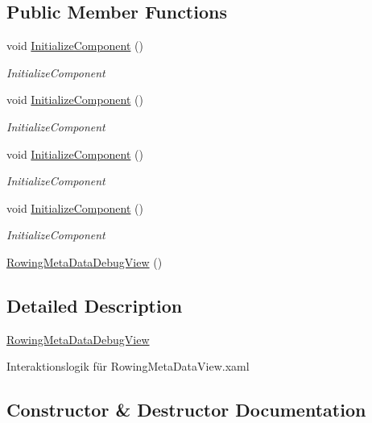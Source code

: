 \subsection*{Public Member Functions}
\begin{DoxyCompactItemize}
\item 
void \hyperlink{class_rowing_monitor_1_1_view_1_1_rowing_meta_data_debug_view_abc8c4176d174df5466c0503576ecc5c9}{Initialize\+Component} ()
\begin{DoxyCompactList}\small\item\em Initialize\+Component \end{DoxyCompactList}\item 
void \hyperlink{class_rowing_monitor_1_1_view_1_1_rowing_meta_data_debug_view_abc8c4176d174df5466c0503576ecc5c9}{Initialize\+Component} ()
\begin{DoxyCompactList}\small\item\em Initialize\+Component \end{DoxyCompactList}\item 
void \hyperlink{class_rowing_monitor_1_1_view_1_1_rowing_meta_data_debug_view_abc8c4176d174df5466c0503576ecc5c9}{Initialize\+Component} ()
\begin{DoxyCompactList}\small\item\em Initialize\+Component \end{DoxyCompactList}\item 
void \hyperlink{class_rowing_monitor_1_1_view_1_1_rowing_meta_data_debug_view_abc8c4176d174df5466c0503576ecc5c9}{Initialize\+Component} ()
\begin{DoxyCompactList}\small\item\em Initialize\+Component \end{DoxyCompactList}\item 
\hyperlink{class_rowing_monitor_1_1_view_1_1_rowing_meta_data_debug_view_aeffe9774bb2511a7f8217a495fc25d60}{Rowing\+Meta\+Data\+Debug\+View} ()
\end{DoxyCompactItemize}


\subsection{Detailed Description}
\hyperlink{class_rowing_monitor_1_1_view_1_1_rowing_meta_data_debug_view}{Rowing\+Meta\+Data\+Debug\+View} 

Interaktionslogik für Rowing\+Meta\+Data\+View.\+xaml 

\subsection{Constructor \& Destructor Documentation}
\mbox{\label{class_rowing_monitor_1_1_view_1_1_rowing_meta_data_debug_view_aeffe9774bb2511a7f8217a495fc25d60}} 
